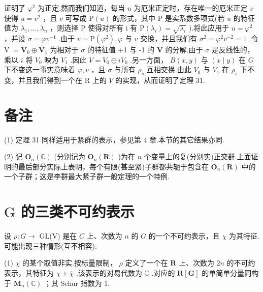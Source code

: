 \documentclass[10pt]{article}
\begin{document}
证明了 \({\varphi }^{2}\) 为正定.然而我们知道，每当 \(u\) 为厄米正定时，存在唯一的厄米正定 \(v\) 使得 \(u = {v}^{2}\) ，且 \(v\) 可写成 \(\mathrm{P}\left( u\right)\) 的形式，其中 \(\mathrm{P}\) 是实系数多项式(若 \(u\) 的特征值为 \({\lambda }_{1},\ldots ,{\lambda }_{n}\) ，则选择 \(\mathrm{P}\) 使得对所有 i 有 \(\mathrm{P}\left( {\lambda }_{i}\right)  = \sqrt{{\lambda }_{i}}\) ).将此应用于 \(u = {\varphi }^{2}\) ，并设 \(\sigma  = \varphi {v}^{-1}\) .由于 \(v = \mathrm{P}\left( {\varphi }^{2}\right) ,\varphi\) 与 \(v\) 交换，并且我们有 \({\sigma }^{2} = {\varphi }^{2}{v}^{-2} = 1\) .令 \(\mathrm{V} \; = {\mathbf{V}}_{0} \oplus  {\mathbf{V}}_{1}\) 为相对于 \(\sigma\) 的特征值 +1 与 -1 的 \(\mathbf{V}\) 的分解.由于 \(\sigma\) 是反线性的，乘以 \(i\) 将 \({V}_{0}\) 映为 \({V}_{1}\) .因此 \(V = {V}_{0} \oplus  i{V}_{0}\) .另一方面， \(B\left( {x,y}\right)\) 与 \(\left( {x \mid  y}\right)\) 在 \(G\) 下不变这一事实意味着 \(\varphi ,v\) ，且 \(\sigma\) 与所有 \({\rho }_{s}\) 互相交换.由此 \({V}_{0}\) 与 \({V}_{1}\) 在 \({\rho }_{s}\) 下不变，并且我们得到一个在 R 上的 \(V\) 的实现，从而证明了定理 31.

\section*{备注}

(1) 定理 31 同样适用于紧群的表示，参见第 4 章.本节的其它结果亦同.

(2) 记 \({\mathbf{O}}_{n}\left( \mathbb{C}\right)\) (分别记为 \({\mathbf{O}}_{n}\left( \mathbf{R}\right)\) )为在 \(n\) 个变量上的复(分别实)正交群.上面证明的最后部分实际上表明，每个有限(甚至紧)子群都共轭于包含在 \({\mathbf{O}}_{n}\left( \mathbf{R}\right)\) 中的一个子群；这是李群最大紧子群一般定理的一个特例.

\section*{\(\mathrm{G}\) 的三类不可约表示}

设 \(\rho  : G \rightarrow\) GL(V) 是在 \(C\) 上、次数为 \(n\) 的 \(G\) 的一个不可约表示，且 \(\chi\) 为其特征.可能出现三种情形(互不相容):

(1) \(\chi\) 的某个取值非实.按标量限制， \(\rho\) 定义了一个在 \(\mathbf{R}\) 上、次数为 \({2n}\) 的不可约表示，其特征为 \(\chi  + \overline{\chi }\) .该表示的对易代数为 \(\mathbb{C}\) .对应的 \(\mathbf{R}\left\lbrack  \mathbf{G}\right\rbrack\) 的单简单分量同构于 \({\mathbf{M}}_{n}\left( \mathbb{C}\right)\) ；其 Schur 指数为 1.
\end{document}
